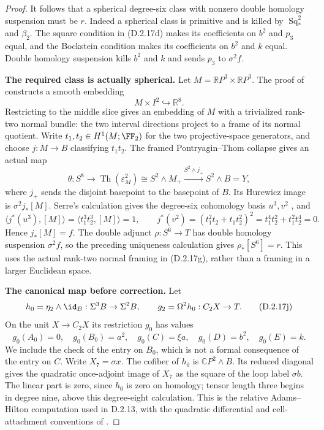 \begin{proof}
It follows that a spherical degree-six class with nonzero double
homology suspension must be $r$. Indeed a spherical class is primitive
and is killed by $\operatorname{Sq}_*^2$ and $\beta_2$. The square
condition in \textup{(D.2.17d)} makes its coefficients on $b^2$ and
$p_3$ equal, and the Bockstein condition makes its coefficients on
$b^2$ and $k$ equal. Double homology suspension kills $b^2$ and $k$
and sends $p_3$ to $\sigma^2f$.

\medskip\noindent
\textbf{The required class is actually spherical.}
Let $M=\mathbb RP^3\times\mathbb RP^3$.
The proof of \cite[Theorem~1.1, p.~9]{EH5AkhmetievRepovsSkopenkov2001}
constructs a smooth embedding
\[
 M\times I^2\hookrightarrow\mathbb R^8.
 \tag{D.2.17g}
\]
Restricting to the middle slice gives an embedding of $M$ with a
trivialized rank-two normal bundle: the two interval directions
project to a frame of its normal quotient. Write
$t_1,t_2\in H^1(M;\FF_2)$ for the two projective-space generators,
and choose $j:M\to B$ classifying $t_1t_2$. The framed
Pontryagin--Thom collapse gives an actual map
\[
 \theta:S^8\longrightarrow
 \operatorname{Th}(\varepsilon_M^2)
 \cong S^2\wedge M_+
 \xrightarrow{S^2\wedge j_+} S^2\wedge B=Y,
 \tag{D.2.17h}
\]
where $j_+$ sends the disjoint basepoint to the basepoint of $B$.
Its Hurewicz image is $\sigma^2j_*[M]$. Serre's calculation gives
the degree-six cohomology basis $u^3,v^2$
\cite[\S2, nos.~8--9, pp.~203--204]{I_Serre1953}, and
\[
 \langle j^*(u^3),[M]\rangle
   =\langle t_1^3t_2^3,[M]\rangle=1,
 \qquad
 j^*(v^2)=(t_1^2t_2+t_1t_2^2)^2
          =t_1^4t_2^2+t_1^2t_2^4=0.
 \tag{D.2.17i}
\]
Hence $j_*[M]=f$. The double adjunct $\rho:S^6\to T$ has double
homology suspension $\sigma^2f$, so the preceding uniqueness
calculation gives $\rho_*[S^6]=r$. This uses the actual rank-two
normal framing in \textup{(D.2.17g)}, rather than a framing in a
larger Euclidean space.

\medskip\noindent
\textbf{The canonical map before correction.}
Let
\[
 h_0=\eta_2\wedge\id_B:\Sigma^3B\to\Sigma^2B,
 \qquad
 g_2=\Omega^2h_0:C_2X\to T.
 \tag{D.2.17j}
\]
On the unit $X\to C_2X$ its restriction $g_0$ has values
\[
 g_0(A_0)=0,\quad g_0(B_0)=a^2,\quad g_0(C)=\xi a,
 \quad g_0(D)=b^2,\quad g_0(E)=k.
 \tag{D.2.17k}
\]
We include the check of the entry on $B_0$, which is not a formal
consequence of the entry on $C$. Write $X_7=\sigma x$.
The cofiber of $h_0$ is $\mathbb CP^2\wedge B$. Its reduced
diagonal gives the quadratic once-adjoint image of $X_7$ as the
square of the loop label $\sigma b$. The linear part is zero,
since $h_0$ is zero on homology; tensor length three begins in
degree nine, above this degree-eight calculation. This is the
relative Adams--Hilton computation used in D.2.13, with the
quadratic differential and cell-attachment conventions of
\cite[\S3.1, p.~300; proof of Proposition~7.4, p.~309]{FGHHalperinLemaire1995}.


\end{proof}
